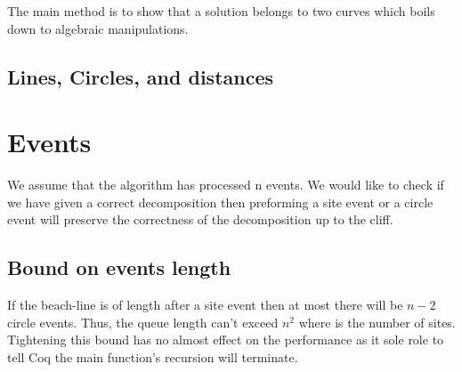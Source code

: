\documentclass{article}
\begin{document}
The main method is to show that a solution belongs to two curves which boils down to algebraic manipulations.

\subsection{Lines, Circles, and distances}
\section{Events}
We assume that the algorithm has processed n events. We would like to check if we have given a correct decomposition then preforming a site event or a circle event will preserve the correctness of the decomposition up to the cliff.

\subsection{Bound on events length} If the beach-line is of length after a site event then at most there will be $n-2$ circle events. Thus, the queue length can't exceed $n^2$ where is the number of sites. Tightening this bound has no almost effect on the performance as it sole role to tell Coq the main function's recursion will terminate.
\end{document}
